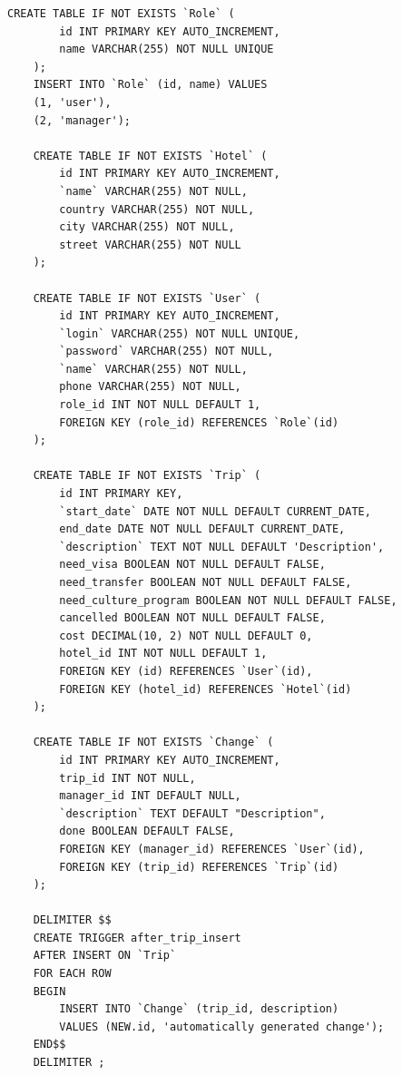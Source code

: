 \documentclass[a4paper,12pt]{article}
\begin{document}
\begin{lstlisting}[label={lst:sql-example}]
    CREATE TABLE IF NOT EXISTS `Role` (
        id INT PRIMARY KEY AUTO_INCREMENT,
        name VARCHAR(255) NOT NULL UNIQUE
    );
    INSERT INTO `Role` (id, name) VALUES
    (1, 'user'),
    (2, 'manager');
    
    CREATE TABLE IF NOT EXISTS `Hotel` (
        id INT PRIMARY KEY AUTO_INCREMENT,
        `name` VARCHAR(255) NOT NULL,
        country VARCHAR(255) NOT NULL,
        city VARCHAR(255) NOT NULL,
        street VARCHAR(255) NOT NULL
    );
    
    CREATE TABLE IF NOT EXISTS `User` (
        id INT PRIMARY KEY AUTO_INCREMENT,
        `login` VARCHAR(255) NOT NULL UNIQUE,
        `password` VARCHAR(255) NOT NULL,
        `name` VARCHAR(255) NOT NULL,
        phone VARCHAR(255) NOT NULL,
        role_id INT NOT NULL DEFAULT 1,
        FOREIGN KEY (role_id) REFERENCES `Role`(id)
    );
    
    CREATE TABLE IF NOT EXISTS `Trip` (
        id INT PRIMARY KEY,
        `start_date` DATE NOT NULL DEFAULT CURRENT_DATE,
        end_date DATE NOT NULL DEFAULT CURRENT_DATE,
        `description` TEXT NOT NULL DEFAULT 'Description',
        need_visa BOOLEAN NOT NULL DEFAULT FALSE,
        need_transfer BOOLEAN NOT NULL DEFAULT FALSE,
        need_culture_program BOOLEAN NOT NULL DEFAULT FALSE,
        cancelled BOOLEAN NOT NULL DEFAULT FALSE,
        cost DECIMAL(10, 2) NOT NULL DEFAULT 0,
        hotel_id INT NOT NULL DEFAULT 1,
        FOREIGN KEY (id) REFERENCES `User`(id),
        FOREIGN KEY (hotel_id) REFERENCES `Hotel`(id)
    );
    
    CREATE TABLE IF NOT EXISTS `Change` (
        id INT PRIMARY KEY AUTO_INCREMENT,
        trip_id INT NOT NULL,
        manager_id INT DEFAULT NULL,
        `description` TEXT DEFAULT "Description",
        done BOOLEAN DEFAULT FALSE,
        FOREIGN KEY (manager_id) REFERENCES `User`(id),
        FOREIGN KEY (trip_id) REFERENCES `Trip`(id)
    );
    
    DELIMITER $$
    CREATE TRIGGER after_trip_insert
    AFTER INSERT ON `Trip`
    FOR EACH ROW
    BEGIN
        INSERT INTO `Change` (trip_id, description)
        VALUES (NEW.id, 'automatically generated change');
    END$$
    DELIMITER ;
    
\end{lstlisting}
\end{document}
